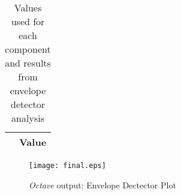 \begin{table}[h]
  \centering
  \begin{tabular}{|c|c|}
    \hline    
     & { Value} \\ \hline
    
 \end{tabular}
 \caption{Values used for each component and results from envelope detector analysis}
  \label{tab:op2}
\end{table}


\begin{figure}[h]
    \centering
    \texttt{[image: final.eps]}
    \caption{{\it Octave} output: Envelope Dectector Plot}
    \label{fig:OctaveOut}
\end{figure}

